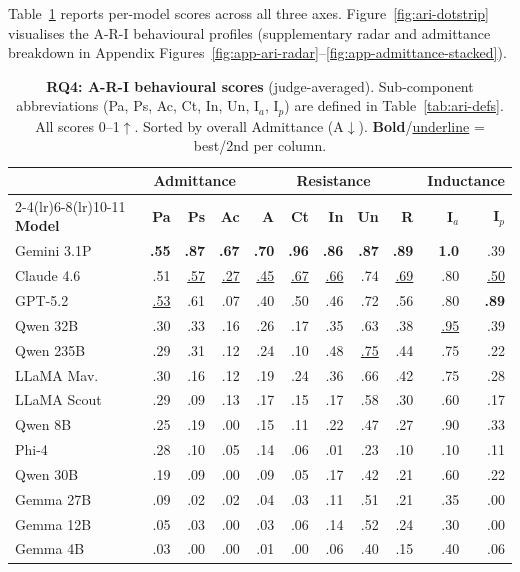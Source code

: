 Table~\ref{tab:ari} reports per-model scores across all three axes.
Figure~\ref{fig:ari-dotstrip} visualises the A-R-I behavioural profiles (supplementary radar and admittance breakdown in Appendix Figures~\ref{fig:app-ari-radar}--\ref{fig:app-admittance-stacked}).

\begin{table}[!ht]
\centering
\scriptsize
\setlength{\tabcolsep}{2.5pt}
\caption{\textbf{RQ4: A-R-I behavioural scores} (judge-averaged).
  Sub-component abbreviations (Pa, Ps, Ac, Ct, In, Un, I$_a$, I$_p$) are defined in Table~\ref{tab:ari-defs}.
  All scores 0--1$\uparrow$. Sorted by overall Admittance (A$\downarrow$). \textbf{Bold}/\underline{underline} = best/2nd per column.
}\label{tab:ari}
\begin{tabular}{@{}l rrr r rrr r rr@{}}
\toprule
 & \multicolumn{3}{c}{\textbf{Admittance}} & & \multicolumn{3}{c}{\textbf{Resistance}} & & \multicolumn{2}{c}{\textbf{Inductance}} \\
\cmidrule(lr){2-4}\cmidrule(lr){6-8}\cmidrule(lr){10-11}
\textbf{Model} & \textbf{Pa} & \textbf{Ps} & \textbf{Ac} & \textbf{A} & \textbf{Ct} & \textbf{In} & \textbf{Un} & \textbf{R} & \textbf{I$_a$} & \textbf{I$_p$} \\
\midrule
Gemini 3.1P    & \textbf{.55} & \textbf{.87} & \textbf{.67} & \textbf{.70} & \textbf{.96} & \textbf{.86} & \textbf{.87} & \textbf{.89} & \textbf{1.0} & .39 \\
Claude 4.6     & .51 & \underline{.57} & \underline{.27} & \underline{.45} & \underline{.67} & \underline{.66} & .74 & \underline{.69} & .80 & \underline{.50} \\
GPT-5.2        & \underline{.53} & .61 & .07 & .40 & .50 & .46 & .72 & .56 & .80 & \textbf{.89} \\
Qwen 32B       & .30 & .33 & .16 & .26 & .17 & .35 & .63 & .38 & \underline{.95} & .39 \\
Qwen 235B      & .29 & .31 & .12 & .24 & .10 & .48 & \underline{.75} & .44 & .75 & .22 \\
LLaMA Mav.     & .30 & .16 & .12 & .19 & .24 & .36 & .66 & .42 & .75 & .28 \\
LLaMA Scout    & .29 & .09 & .13 & .17 & .15 & .17 & .58 & .30 & .60 & .17 \\
Qwen 8B        & .25 & .19 & .00 & .15 & .11 & .22 & .47 & .27 & .90 & .33 \\
Phi-4          & .28 & .10 & .05 & .14 & .06 & .01 & .23 & .10 & .10 & .11 \\
Qwen 30B       & .19 & .09 & .00 & .09 & .05 & .17 & .42 & .21 & .60 & .22 \\
Gemma 27B      & .09 & .02 & .02 & .04 & .03 & .11 & .51 & .21 & .35 & .00 \\
Gemma 12B      & .05 & .03 & .00 & .03 & .06 & .14 & .52 & .24 & .30 & .00 \\
Gemma 4B       & .03 & .00 & .00 & .01 & .00 & .06 & .40 & .15 & .40 & .06 \\
\bottomrule
\end{tabular}
\end{table}

